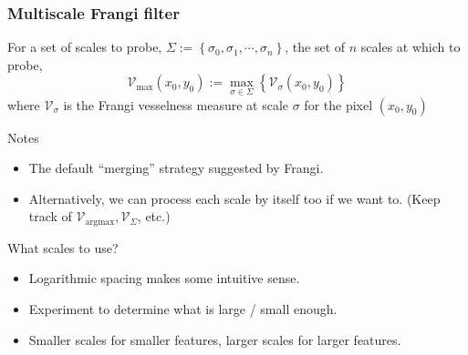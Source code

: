 \documentclass[9pt]{beamer}
\newcommand{\Vmax}{\ensuremath{\mathcal{V}_{\max}}\xspace}
\newcommand{\Vargmax}{\ensuremath{\mathcal{V}_{\mathrm{argmax}}}\xspace}
\newcommand{\VSigma}{\ensuremath{\mathcal{V}_{\Sigma}}\xspace}
\newcommand{\Vsigma}{\ensuremath{\mathcal{V}_{\sigma}}\xspace}
\begin{document}
\begin{frame}
\frametitle{Multiscale Frangi filter}
For a set of scales to probe, $\Sigma := \left\{ \sigma_0, \sigma_1 , \cdots, \sigma_n \right\}$,
the set of $n$ scales at which to probe,
\begin{equation}
\Vmax(x_0, y_0) :=
\underset{\sigma \in \Sigma}{\max}\left\{  \Vsigma (x_0, y_0) \right\}
\end{equation}
where \Vsigma is the Frangi vesselness measure at scale $\sigma$ for the pixel $(x_0,y_0)$

\begin{block}{Notes}
\begin{itemize}
  \item The default ``merging'' strategy suggested by Frangi.
  \item Alternatively, we can process each scale by itself too if we want to.
        (Keep track of $\Vargmax, \VSigma$, etc.)
\end{itemize}
\end{block}
\begin{block}{What scales to use?}
    \begin{itemize}
      \item Logarithmic spacing makes some intuitive sense.
      \item Experiment to determine what is large / small enough.
      \item Smaller scales for smaller features, larger scales for larger features.
    \end{itemize}
\end{block}
\end{frame}
\end{document}
